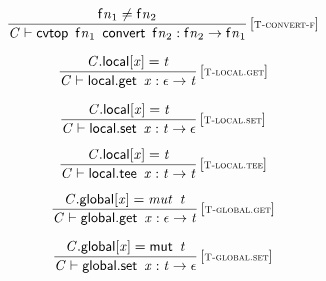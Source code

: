 $$
\begin{array}{@{}c@{}}\displaystyle
\frac{
{{\mathsf{f}}{{\mathit{n}}}}_{{1}} \neq {{\mathsf{f}}{{\mathit{n}}}}_{{2}}
}{
{\mathit{C}} \vdash \mathsf{cvtop}~\,{{\mathsf{f}}{{\mathit{n}}}}_{{1}}~\,\mathsf{convert}~\,{{\mathsf{f}}{{\mathit{n}}}}_{{2}} : {{\mathsf{f}}{{\mathit{n}}}}_{{2}} \rightarrow {{\mathsf{f}}{{\mathit{n}}}}_{{1}}
} \, {[\textsc{\scriptsize T{-}convert{-}f}]}
\qquad
\end{array}
$$

\vspace{1ex}

$$
\begin{array}{@{}c@{}}\displaystyle
\frac{
{\mathit{C}}.\mathsf{local}{}[{\mathit{x}}] = {\mathit{t}}
}{
{\mathit{C}} \vdash \mathsf{local.get}~\,{\mathit{x}} : \epsilon \rightarrow {\mathit{t}}
} \, {[\textsc{\scriptsize T{-}local.get}]}
\qquad
\end{array}
$$

$$
\begin{array}{@{}c@{}}\displaystyle
\frac{
{\mathit{C}}.\mathsf{local}{}[{\mathit{x}}] = {\mathit{t}}
}{
{\mathit{C}} \vdash \mathsf{local.set}~\,{\mathit{x}} : {\mathit{t}} \rightarrow \epsilon
} \, {[\textsc{\scriptsize T{-}local.set}]}
\qquad
\end{array}
$$

$$
\begin{array}{@{}c@{}}\displaystyle
\frac{
{\mathit{C}}.\mathsf{local}{}[{\mathit{x}}] = {\mathit{t}}
}{
{\mathit{C}} \vdash \mathsf{local.tee}~\,{\mathit{x}} : {\mathit{t}} \rightarrow {\mathit{t}}
} \, {[\textsc{\scriptsize T{-}local.tee}]}
\qquad
\end{array}
$$

\vspace{1ex}

$$
\begin{array}{@{}c@{}}\displaystyle
\frac{
{\mathit{C}}.\mathsf{global}{}[{\mathit{x}}] = {\mathit{mut}}~\,{\mathit{t}}
}{
{\mathit{C}} \vdash \mathsf{global.get}~\,{\mathit{x}} : \epsilon \rightarrow {\mathit{t}}
} \, {[\textsc{\scriptsize T{-}global.get}]}
\qquad
\end{array}
$$

$$
\begin{array}{@{}c@{}}\displaystyle
\frac{
{\mathit{C}}.\mathsf{global}{}[{\mathit{x}}] = \mathsf{mut}~\,{\mathit{t}}
}{
{\mathit{C}} \vdash \mathsf{global.set}~\,{\mathit{x}} : {\mathit{t}} \rightarrow \epsilon
} \, {[\textsc{\scriptsize T{-}global.set}]}
\qquad
\end{array}
$$

